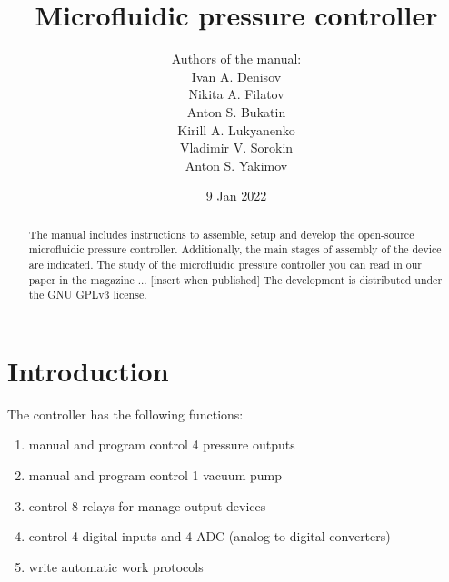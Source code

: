 \documentclass[twoside, 12pt, a4paper]{refart}
\title{Microfluidic pressure controller}
\author{
  Authors of the manual: \\
  Ivan A. Denisov \\ %
  Nikita A. Filatov \\ %
  Anton S. Bukatin \\ %
  Kirill A. Lukyanenko\\  %
  Vladimir V. Sorokin\\ %
  Anton S. Yakimov\\  %
}
\date{9 Jan 2022}
\begin{document}
  \maketitle

  \begin{abstract}
    The manual includes instructions to assemble, setup and develop the open-source microfluidic pressure controller. Additionally, the main stages of assembly of the device are indicated.
    The study of the microfluidic pressure controller you can read in our paper in the magazine ... [insert when published]
    The development is distributed under the GNU GPLv3 license.
  \end{abstract}

  \tableofcontents

  \newpage



  \section{Introduction}
    \label{intro}
    

    The controller has the following functions:
    \begin{enumerate}
      \item manual and program control 4 pressure outputs   
      \item manual and program control 1 vacuum pump
      \item control 8 relays for manage output devices
      \item control 4 digital inputs and 4 ADC (analog-to-digital converters)
      \item write automatic work protocols
    \end{enumerate}
 
    
\end{document}
